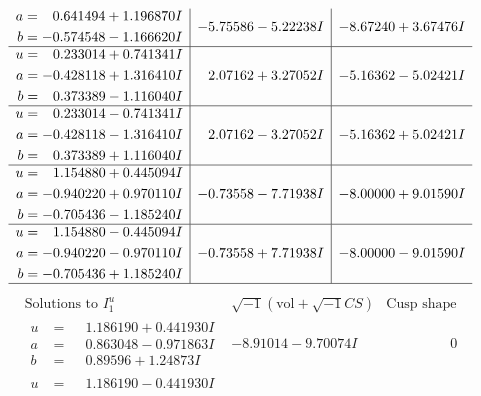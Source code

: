 \documentclass[1p]{elsarticle_modified}
\theoremstyle{definition}
\newcommand{\I}{\sqrt{-1}}
\begin{document}
$$\begin{array}{c|c|c}
\begin{aligned}
a &= \phantom{-}0.641494 + 1.196870 I \\
b &= -0.574548 - 1.166620 I\end{aligned}
 & -5.75586 - 5.22238 I & -8.67240 + 3.67476 I \\ \hline\begin{aligned}
u &= \phantom{-}0.233014 + 0.741341 I \\
a &= -0.428118 + 1.316410 I \\
b &= \phantom{-}0.373389 - 1.116040 I\end{aligned}
 & \phantom{-}2.07162 + 3.27052 I & -5.16362 - 5.02421 I \\ \hline\begin{aligned}
u &= \phantom{-}0.233014 - 0.741341 I \\
a &= -0.428118 - 1.316410 I \\
b &= \phantom{-}0.373389 + 1.116040 I\end{aligned}
 & \phantom{-}2.07162 - 3.27052 I & -5.16362 + 5.02421 I \\ \hline\begin{aligned}
u &= \phantom{-}1.154880 + 0.445094 I \\
a &= -0.940220 + 0.970110 I \\
b &= -0.705436 - 1.185240 I\end{aligned}
 & -0.73558 - 7.71938 I & -8.00000 + 9.01590 I \\ \hline\begin{aligned}
u &= \phantom{-}1.154880 - 0.445094 I \\
a &= -0.940220 - 0.970110 I \\
b &= -0.705436 + 1.185240 I\end{aligned}
 & -0.73558 + 7.71938 I & -8.00000 - 9.01590 I\\
 \hline 
 \end{array}$$\newpage$$\begin{array}{c|c|c}  
\text{Solutions to }I^u_{1}& \I (\text{vol} + \sqrt{-1}CS) & \text{Cusp shape}\\
 \hline 
\begin{aligned}
u &= \phantom{-}1.186190 + 0.441930 I \\
a &= \phantom{-}0.863048 - 0.971863 I \\
b &= \phantom{-}0.89596 + 1.24873 I\end{aligned}
 & -8.91014 - 9.70074 I & \phantom{-0.000000 } 0 \\ \hline\begin{aligned}
u &= \phantom{-}1.186190 - 0.441930 I \\

\end{aligned}
\end{array}$$
\end{document}
